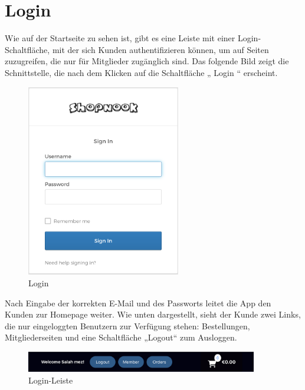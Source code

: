 \section{Login}

Wie auf der Startseite zu sehen ist, gibt es eine Leiste mit einer Login-Schaltfläche, mit der sich Kunden authentifizieren können, um auf Seiten zuzugreifen, die nur für Mitglieder zugänglich sind. Das folgende Bild zeigt die Schnittstelle, die nach dem Klicken auf die Schaltfläche „ Login “ erscheint.

\begin{figure}[H]  
	\centering %
	\includegraphics[width=0.6\textwidth]{Images/Login.png} 
	\caption{Login} 
	\label{fig:sample6-image} 
\end{figure}


Nach Eingabe der korrekten E-Mail und des Passworts leitet die App den Kunden zur Homepage weiter. Wie unten dargestellt, sieht der Kunde zwei Links, die nur eingeloggten Benutzern zur Verfügung stehen: Bestellungen, Mitgliederseiten und eine Schaltfläche „Logout“ zum Ausloggen.



\begin{figure}[H]  
	\centering %
	\includegraphics[width=0.9\textwidth]{Images/Login-bar.png} 
	\caption{Login-Leiste} 
	\label{fig:sample7-image} 
\end{figure}

